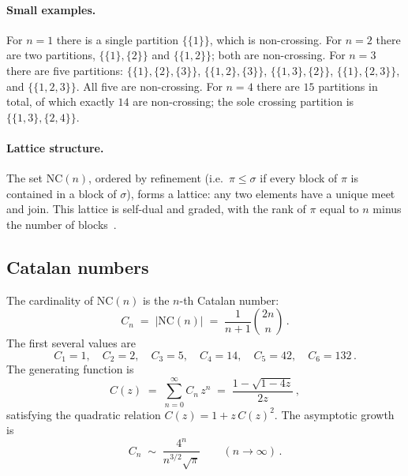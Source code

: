 \documentclass[11pt,letterpaper]{article}
\theoremstyle{plain}
\theoremstyle{definition}
\theoremstyle{remark}
\begin{document}
\paragraph{Small examples.}
For $n=1$ there is a single partition $\{\{1\}\}$, which is non-crossing.
For $n=2$ there are two partitions, $\{\{1\},\{2\}\}$ and
$\{\{1,2\}\}$; both are non-crossing.  For $n=3$ there are five
partitions: $\{\{1\},\{2\},\{3\}\}$, $\{\{1,2\},\{3\}\}$,
$\{\{1,3\},\{2\}\}$, $\{\{1\},\{2,3\}\}$, and $\{\{1,2,3\}\}$.  All
five are non-crossing.  For $n=4$ there are $15$ partitions in total, of
which exactly $14$ are non-crossing; the sole crossing partition is
$\{\{1,3\},\{2,4\}\}$.

\paragraph{Lattice structure.}
The set $\mathrm{NC}(n)$, ordered by refinement (i.e.\ $\pi \leq \sigma$
if every block of $\pi$ is contained in a block of $\sigma$), forms a
lattice: any two elements have a unique meet and join.  This lattice is
self-dual and graded, with the rank of $\pi$ equal to $n$ minus the
number of blocks~\cite{nicaspeicher2006}.

\subsection{Catalan numbers}
\label{subsec11:catalan}

The cardinality of $\mathrm{NC}(n)$ is the $n$-th Catalan number:
\begin{equation}
\label{eq11:catalan}
  C_n
  \;=\;
  \bigl|\mathrm{NC}(n)\bigr|
  \;=\;
  \frac{1}{n+1}\binom{2n}{n}\,.
\end{equation}
The first several values are
\begin{equation}
\label{eq11:catalan_values}
  C_1 = 1,\quad
  C_2 = 2,\quad
  C_3 = 5,\quad
  C_4 = 14,\quad
  C_5 = 42,\quad
  C_6 = 132\,.
\end{equation}
The generating function is
\begin{equation}
\label{eq11:catalan_gf}
  C(z)
  \;=\;
  \sum_{n=0}^{\infty} C_n\, z^n
  \;=\;
  \frac{1 - \sqrt{1 - 4z}}{2z}\,,
\end{equation}
satisfying the quadratic relation $C(z) = 1 + z\,C(z)^2$.  The
asymptotic growth is
\begin{equation}
\label{eq11:catalan_asymp}
  C_n
  \;\sim\;
  \frac{4^n}{n^{3/2}\sqrt{\pi}}
  \qquad
  (n \to \infty)\,.
\end{equation}
\end{document}
